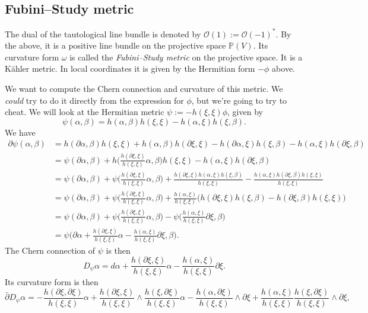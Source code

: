 \documentclass[11pt]{article}
\newcommand{\kk}[1]{\mathbb{#1}}
\newcommand{\cc}[1]{\mathcal{#1}}
\begin{document}
\subsection{Fubini--Study metric}

The dual of the tautological line bundle is denoted by $\cc O(1) := \cc O(-1)^*$. By the above, it is a positive line bundle on the projective space $\kk P(V)$. Its curvature form $\omega$ is called the \emph{Fubini--Study metric} on the projective space. It is a K\"ahler metric. In local coordinates it is given by the Hermitian form $-\phi$ above.

We want to compute the Chern connection and curvature of this metric. We \emph{could} try to do it directly from the expression for $\phi$, but we're going to try to cheat. We will look at the Hermitian metric $\psi := -h(\xi,\xi) \phi$, given by
$$
\psi(\alpha, \beta) = h(\alpha, \beta) h(\xi, \xi) - h(\alpha, \xi) h(\xi, \beta).
$$
We have
\begin{align*}
\partial\psi(\alpha, \beta)
&= h(\partial\alpha, \beta) h(\xi, \xi)
+ h(\alpha, \beta) h(\partial\xi, \xi)
- h(\partial\alpha, \xi) h(\xi, \beta)
- h(\alpha, \xi) h(\partial\xi, \beta)
\\
&= \psi(\partial\alpha, \beta)
+ h\biggl(\frac{h(\partial\xi, \xi)}{h(\xi,\xi)} \alpha, \beta\biggr) h(\xi,\xi)
- h(\alpha, \xi) h(\partial\xi, \beta)
\\
&= \psi(\partial\alpha, \beta)
+ \psi\biggl(\frac{h(\partial\xi, \xi)}{h(\xi,\xi)} \alpha, \beta\biggr)
+ \frac{h(\partial\xi, \xi)h(\alpha,\xi) h(\xi,\beta)}{h(\xi,\xi)}
- \frac{h(\alpha, \xi) h(\partial\xi, \beta)h(\xi,\xi)}{h(\xi,\xi)}
\\
&= \psi(\partial\alpha, \beta)
+ \psi\biggl(\frac{h(\partial\xi, \xi)}{h(\xi,\xi)} \alpha, \beta\biggr)
+ \frac{h(\alpha,\xi)}{h(\xi,\xi)} \bigl(h(\partial\xi,\xi)h(\xi,\beta) - h(\partial\xi,\beta)h(\xi,\xi)\bigr)
\\
&=\psi(\partial\alpha, \beta)
+ \psi\biggl(\frac{h(\partial\xi, \xi)}{h(\xi,\xi)} \alpha, \beta\biggr)
- \psi\biggl(\frac{h(\alpha,\xi)}{h(\xi,\xi)} \partial\xi,\beta\biggr)
\\
&=
\psi\biggl(
\partial\alpha
+ \frac{h(\partial\xi, \xi)}{h(\xi,\xi)} \alpha
- \frac{h(\alpha,\xi)}{h(\xi,\xi)} \partial\xi
, \beta
\biggr).
\end{align*}
The Chern connection of $\psi$ is then
$$
D_\psi \alpha = d\alpha
+ \frac{h(\partial\xi, \xi)}{h(\xi,\xi)} \alpha
- \frac{h(\alpha,\xi)}{h(\xi,\xi)} \partial\xi.
$$
Its curvature form is then
$$
\bar\partial D_\psi \alpha
= -\frac{h(\partial\xi,\partial\xi)}{h(\xi,\xi)} \alpha
+ \frac{h(\partial\xi,\xi)}{h(\xi,\xi)}\wedge \frac{h(\xi,\partial\xi)}{h(\xi,\xi)} \alpha
- \frac{h(\alpha,\partial\xi)}{h(\xi,\xi)} \wedge \partial\xi
+ \frac{h(\alpha,\xi)}{h(\xi,\xi)}\frac{h(\xi,\partial\xi)}{h(\xi,\xi)} \wedge \partial\xi,
$$
\end{document}
